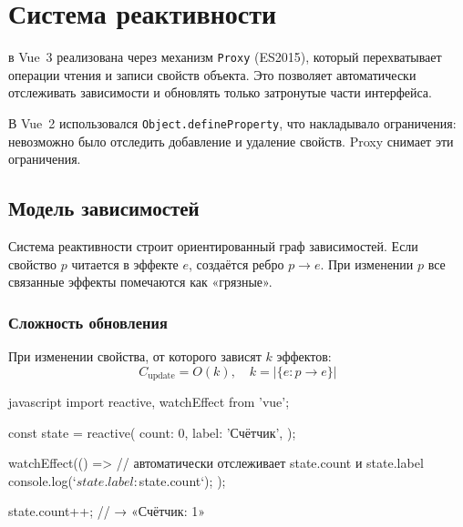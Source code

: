 \section{Система реактивности}

 в Vue~3 реализована через механизм
\texttt{Proxy} (ES2015), который перехватывает операции чтения и записи
свойств объекта.  Это позволяет автоматически отслеживать зависимости
и обновлять только затронутые части интерфейса.

В Vue~2 использовался \texttt{Object.defineProperty}, что накладывало
ограничения: невозможно было отследить добавление и удаление свойств.
Proxy снимает эти ограничения.

\subsection{Модель зависимостей}

Система реактивности строит ориентированный граф зависимостей.
Если свойство $p$ читается в эффекте $e$, создаётся ребро
$p \to e$.  При изменении $p$ все связанные эффекты помечаются
как «грязные».

\subsubsection{Сложность обновления}

При изменении свойства, от которого зависят $k$ эффектов:
\begin{equation}
  C_{\text{update}} = O(k), \quad k = |\{e : p \to e\}|
\end{equation}

\begin{code}{javascript}
import { reactive, watchEffect } from 'vue';

const state = reactive({
  count: 0,
  label: 'Счётчик',
});

watchEffect(() => {
  // автоматически отслеживает state.count и state.label
  console.log(`${state.label}: ${state.count}`);
});

state.count++;  // → «Счётчик: 1»
\end{code}


